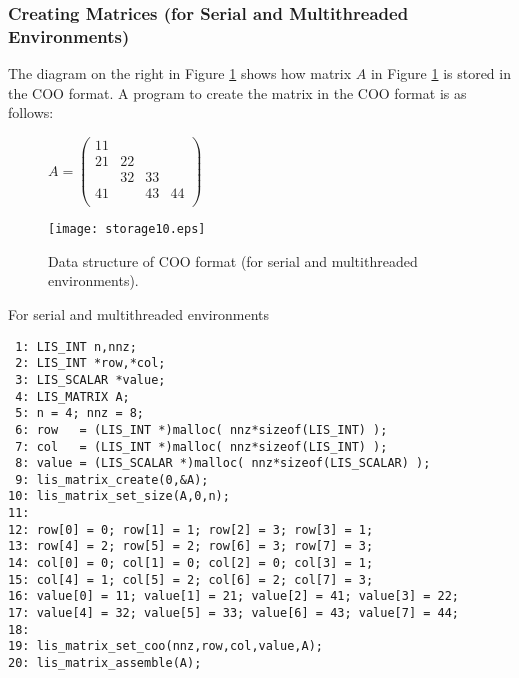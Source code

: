 \documentclass[a4paper]{article}
\begin{document}
\subsubsection{Creating Matrices (for Serial and Multithreaded Environments)}
The diagram on the right in Figure \ref{fig:storage10} shows how matrix $A$ in Figure \ref{fig:storage10} is stored in the COO format. A program to create the matrix in the COO format is as follows:
\begin{figure}[h]
{\centering 
\begin{minipage}{0.3\textwidth}
\begin{flushright}
$ 
A = \left(
\begin{array}{cccc}
11 &    &    &    \\
21 & 22 &    &    \\
   & 32 & 33 &    \\
41 &    & 43 & 44 \\
\end{array}\right)
$
\end{flushright}
\end{minipage}
\begin{minipage}{0.6\textwidth}
\begin{flushleft}
\texttt{[image: storage10.eps]} 
\end{flushleft}
\end{minipage}
\caption{Data structure of COO format (for serial and multithreaded environments).}\label{fig:storage10}}
\end{figure}
\begin{itemsquarebox}[l]{For serial and multithreaded environments}
\small
\begin{verbatim}
 1: LIS_INT n,nnz;
 2: LIS_INT *row,*col;
 3: LIS_SCALAR *value;
 4: LIS_MATRIX A;
 5: n = 4; nnz = 8;
 6: row   = (LIS_INT *)malloc( nnz*sizeof(LIS_INT) );
 7: col   = (LIS_INT *)malloc( nnz*sizeof(LIS_INT) );
 8: value = (LIS_SCALAR *)malloc( nnz*sizeof(LIS_SCALAR) );
 9: lis_matrix_create(0,&A);
10: lis_matrix_set_size(A,0,n);
11:
12: row[0] = 0; row[1] = 1; row[2] = 3; row[3] = 1;
13: row[4] = 2; row[5] = 2; row[6] = 3; row[7] = 3;
14: col[0] = 0; col[1] = 0; col[2] = 0; col[3] = 1;
15: col[4] = 1; col[5] = 2; col[6] = 2; col[7] = 3;
16: value[0] = 11; value[1] = 21; value[2] = 41; value[3] = 22;
17: value[4] = 32; value[5] = 33; value[6] = 43; value[7] = 44;
18:
19: lis_matrix_set_coo(nnz,row,col,value,A);
20: lis_matrix_assemble(A);
\end{verbatim}
\end{itemsquarebox}
\end{document}
